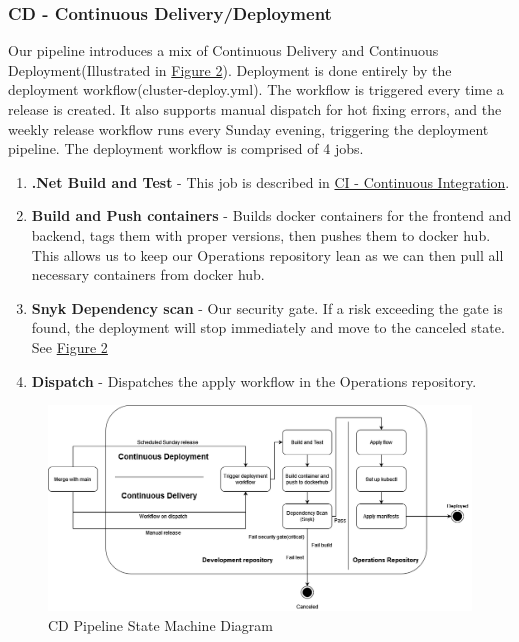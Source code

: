 \subsubsection{CD - Continuous Delivery/Deployment}
\label{subsubsec:cd}

Our pipeline introduces a mix of Continuous Delivery and Continuous Deployment(Illustrated in \hyperref[fig:CDStateMachine]{Figure 2}). Deployment is done entirely by the deployment workflow(cluster-deploy.yml).
The workflow is triggered every time a release is created. It also supports manual dispatch for hot fixing errors, and the weekly release workflow runs every Sunday evening, triggering the deployment pipeline. The deployment workflow is comprised of 4 jobs.
\begin{enumerate}
    \item \textbf{.Net Build and Test} - This job is described in \hyperref[subsubsec:ci]{CI - Continuous Integration}.
    \item \textbf{Build and Push containers} - Builds docker containers for the frontend and backend, tags them with proper versions, then pushes them to docker hub. This allows us to keep our Operations repository lean as we can then pull all necessary containers from docker hub.
    \item \textbf{Snyk Dependency scan} - Our security gate. If a risk exceeding the gate is found, the deployment will stop immediately and move to the canceled state. See \hyperref[fig:CDStateMachine]{Figure 2}
    \item \textbf{Dispatch} - Dispatches the apply workflow in the Operations repository.
\end{enumerate}

\begin {figure}[H]
    \centering
    \includegraphics[scale=0.50]{images/DevopsDiagrams-StateMachineCd.drawio.png}
    \caption{CD Pipeline State Machine Diagram}
    \label{fig:CDStateMachine}
\end{figure}

